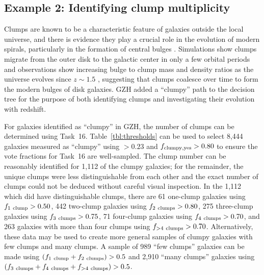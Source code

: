 \documentclass[twocolumn]{aastex6}
\begin{document}
\subsection{Example 2: Identifying clump multiplicity} Clumps are known to be a
characteristic feature of galaxies outside the local universe, and there is
evidence they play a crucial role in the evolution of modern spirals,
particularly in the formation of central bulges
\citep{elm05,elm14,guo15,beh16}. Simulations show clumps migrate from the outer
disk to the galactic center in only a few orbital periods \citep{man15} and
observations show increasing bulge to clump mass and density ratios as the
universe evolves since $z\sim 1.5$ \citep{elm09}, suggesting that clumps
coalesce over time to form the modern bulges of disk galaxies. GZH added a
``clumpy'' path to the decision tree for the purpose of both identifying clumps
and investigating their evolution with redshift. 

For galaxies identified as ``clumpy'' in GZH, the number of clumps can be
determined using Task~16. Table~\ref{tbl:thresholds} can be used to select
8,444 galaxies measured as ``clumpy'' using \ffeatures$> 0.23$ and $f_{\rm
clumpy,yes}>0.80$ to ensure the vote fractions for Task~16 are well-sampled.
The clump number can be reasonably identified for 1,112 of the clumpy galaxies;
for the remainder, the unique clumps were less distinguishable from each other
and the exact number of clumps could not be deduced without careful visual
inspection. In the 1,112 which did have distinguishable clumps, there are
61 one-clump galaxies using $f_{\rm 1~clump}>0.50$, 442 two-clump galaxies
using $f_{\rm 2~clumps}>0.80$, 275 three-clump galaxies using $f_{\rm
3~clumps}>0.75$, 71 four-clump galaxies using $f_{\rm 4~clumps} > 0.70$,
and 263 galaxies with more than four clumps using $f_{\rm >4~clumps}>0.70$.
Alternatively, these data may be used to create more general samples of
clumpy galaxies with few clumps and many clumps. A sample of 989 ``few
clumps'' galaxies can be made using $(f_{\rm 1~clump} + f_{\rm 2~clumps}) >
0.5$ and 2,910 ``many clumps'' galaxies using $(f_{\rm 3~clumps}+f_{\rm
4~clumps}+f_{\rm >4~clumps})>0.5$.
\end{document}
